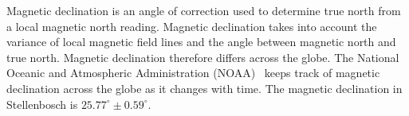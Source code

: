 Magnetic declination is an angle of correction used to determine true north from a local magnetic north reading. Magnetic declination takes into account the variance of local magnetic 
field lines and the angle between magnetic north and true north. Magnetic declination therefore differs across the globe. The National Oceanic and Atmospheric Administration (NOAA) \
keeps track of magnetic declination across the globe as it changes with time. The magnetic declination in Stellenbosch is $25.77^{\circ} \pm 0.59^{\circ}$.   